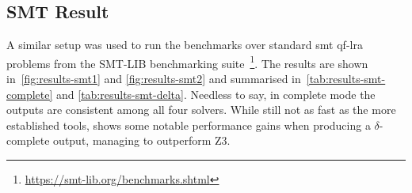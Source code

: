 \documentclass[runningheads]{llncs}
\begin{document}
\subsection*{SMT Result}

A similar setup was used to run the benchmarks over standard \gls{smt} \gls{qf-lra} problems from the SMT-LIB benchmarking suite~\footnote{\url{https://smt-lib.org/benchmarks.shtml}}.
The results are shown in~\autoref{fig:results-smt1} and \autoref{fig:results-smt2} and summarised in~\autoref{tab:results-smt-complete} and \autoref{tab:results-smt-delta}.
Needless to say, in complete mode the outputs are consistent among all four solvers.
While still not as fast as the more established tools, \dlinear shows some notable performance gains when producing a $\delta$-complete output, managing to outperform Z3.
\end{document}
